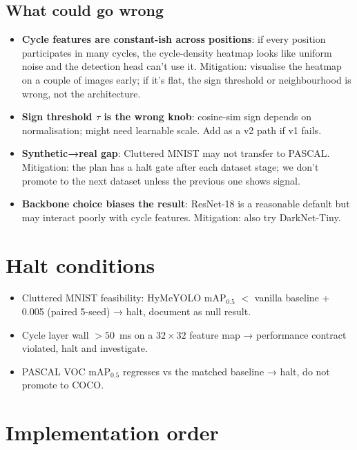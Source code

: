 \documentclass[11pt,a4paper]{article}
\begin{document}
\subsection*{What could go wrong}
\begin{itemize}
\item \textbf{Cycle features are constant-ish across positions}: if
  every position participates in many cycles, the cycle-density
  heatmap looks like uniform noise and the detection head can't use
  it.  Mitigation: visualise the heatmap on a couple of images
  early; if it's flat, the sign threshold or neighbourhood is
  wrong, not the architecture.
\item \textbf{Sign threshold $\tau$ is the wrong knob}: cosine-sim
  sign depends on normalisation; might need learnable scale.  Add as
  a v2 path if v1 fails.
\item \textbf{Synthetic→real gap}: Cluttered MNIST may not transfer
  to PASCAL.  Mitigation: the plan has a halt gate after each
  dataset stage; we don't promote to the next dataset unless the
  previous one shows signal.
\item \textbf{Backbone choice biases the result}: ResNet-18 is a
  reasonable default but may interact poorly with cycle features.
  Mitigation: also try DarkNet-Tiny.
\end{itemize}

\section{Halt conditions}
\begin{itemize}
\item Cluttered MNIST feasibility: HyMeYOLO mAP$_{0.5}$ $<$ vanilla
  baseline + 0.005 (paired 5-seed) → halt, document as null
  result.
\item Cycle layer wall $> 50$~ms on a $32{\times}32$ feature map →
  performance contract violated, halt and investigate.
\item PASCAL VOC mAP$_{0.5}$ regresses vs the matched baseline →
  halt, do not promote to COCO.
\end{itemize}

\section{Implementation order}
\end{document}
